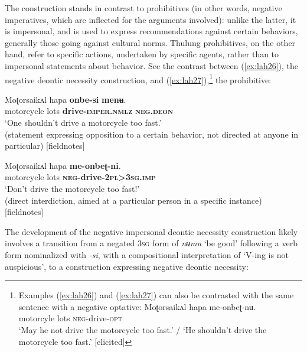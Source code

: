 \documentclass[output=paper,colorlinks,citecolor=brown,
]{langscibook}
\begin{document}
The construction stands in contrast to prohibitives (in other words, negative imperatives, which are inflected for the arguments involved): unlike the latter, it is impersonal, and is used to express recommendations against certain behaviors, generally those going against cultural norms. Thulung prohibitives, on the other hand, refer to specific actions, undertaken by specific agents, rather than to impersonal statements about behavior. See the contrast between (\ref{ex:lah26}), the negative deontic necessity construction, and (\ref{ex:lah27}),\footnote{Examples (\ref{ex:lah26}) and (\ref{ex:lah27}) can also be contrasted with the same sentence with a negative optative:
\ea \label{footnoteex4} 
\gll Moʈorsaikʌl hapa me-onbeʈ-nʉ. \\
motorcyle lots \textsc{neg}-drive-\textsc{opt} \\
\glt `May he not drive the motorcycle too fast.' / `He shouldn't drive the motorcycle too fast.' [elicited]
\z} the prohibitive:


\ea \label{ex:lah26}
\gll Moʈorsaikʌl hapa \textbf{onbe-si} \textbf{menʉ}. \\
motorcycle lots \textbf{drive-\textsc{imper.nmlz}} \textbf{\textsc{neg.deon}} \\
\glt `One shouldn't drive a motorcycle too fast.' \\ (statement expressing opposition to a certain behavior, not directed at anyone in particular) [fieldnotes]
\z


\ea \label{ex:lah27}
\gll Moʈorsaikʌl hapa \textbf{me-onbeʈ-ni}. \\
motorcycle lots \textbf{\textsc{neg}-drive-\textsc{2pl>3sg.imp}} \\
\glt `Don't drive the motorcycle too fast!' \\
(direct interdiction, aimed at a particular person in a specific instance) [fieldnotes]
\z

 The development of the negative impersonal deontic necessity construction likely involves a transition from a negated \textsc{3sg} form of \textit{nʉmu} `be good' following a verb form nominalized with \textit{-si}, with a compositional interpretation of `V-ing is not auspicious', to a construction expressing negative deontic necessity: 




\end{document}
